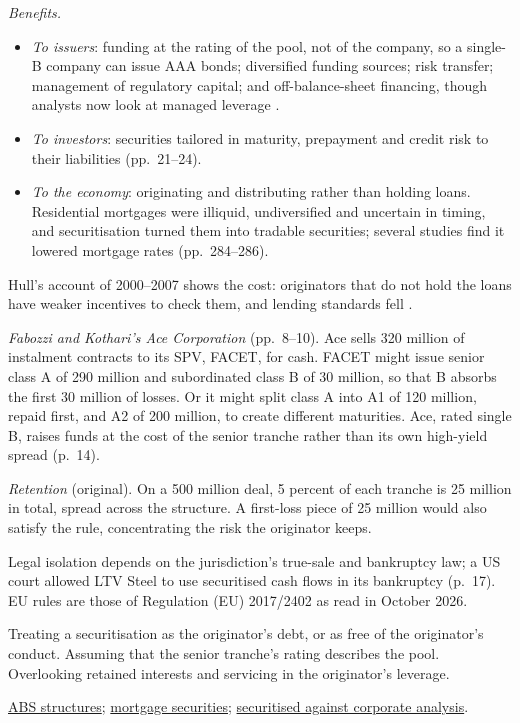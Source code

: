 \begin{qfdefinition}
\emph{Benefits.}
\begin{itemize}
\item \emph{To issuers}: funding at the rating of the pool, not of the company, so a single-B company can issue AAA bonds; diversified funding sources; risk transfer; management of regulatory capital; and off-balance-sheet financing, though analysts now look at managed leverage \citep[pp.~13--20]{fabozzi-kothari-securitisation-2008}.
\item \emph{To investors}: securities tailored in maturity, prepayment and credit risk to their liabilities (pp.~21--24).
\item \emph{To the economy}: originating and distributing rather than holding loans. Residential mortgages were illiquid, undiversified and uncertain in timing, and securitisation turned them into tradable securities; several studies find it lowered mortgage rates (pp.~284--286).
\end{itemize}
Hull's account of 2000--2007 shows the cost: originators that do not hold the loans have weaker incentives to check them, and lending standards fell \citep[pp.~205--206]{s7-hulloptions}.

 \emph{Fabozzi and Kothari's Ace Corporation} (pp.~8--10). Ace sells 320 million of instalment contracts to its SPV, FACET, for cash. FACET might issue senior class A of 290 million and subordinated class B of 30 million, so that B absorbs the first 30 million of losses. Or it might split class A into A1 of 120 million, repaid first, and A2 of 200 million, to create different maturities. Ace, rated single B, raises funds at the cost of the senior tranche rather than its own high-yield spread (p.~14).

\emph{Retention} (original). On a 500 million deal, 5 percent of each tranche is 25 million in total, spread across the structure. A first-loss piece of 25 million would also satisfy the rule, concentrating the risk the originator keeps.

 Legal isolation depends on the jurisdiction's true-sale and bankruptcy law; a US court allowed LTV Steel to use securitised cash flows in its bankruptcy (p.~17). EU rules are those of Regulation (EU) 2017/2402 as read in October 2026.

 Treating a securitisation as the originator's debt, or as free of the originator's conduct. Assuming that the senior tranche's rating describes the pool. Overlooking retained interests and servicing in the originator's leverage.

 \hyperref[meth:abs-structures-credit-enhancement]{ABS structures}; \hyperref[meth:mortgage-securities-prepayment]{mortgage securities}; \hyperref[meth:credit-spread-term-structure]{securitised against corporate analysis}.

\end{qfdefinition}

